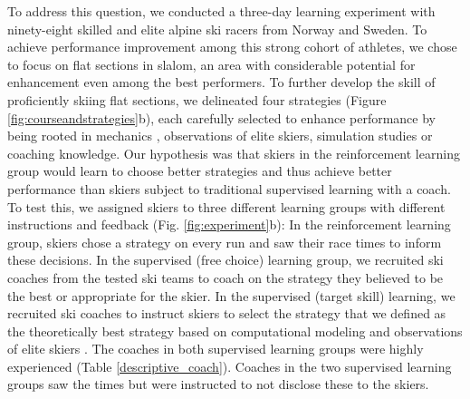 \documentclass[pdflatex,sn-mathphys-num]{sn-jnl}%
\theoremstyle{thmstyleone}%
\theoremstyle{thmstyletwo}%
\theoremstyle{thmstylethree}%
\begin{document}
To address this question, we conducted a three-day learning experiment with ninety-eight skilled and elite alpine ski racers from Norway and Sweden. To achieve performance improvement among this strong cohort of athletes, we chose to focus on flat sections in slalom, an area with considerable potential for enhancement even among the best performers. To further develop the skill of proficiently skiing flat sections, we delineated four strategies (Figure \ref{fig:courseandstrategies}b), each carefully selected to enhance performance by being rooted in mechanics \cite{lind_physics_2013}, observations of elite skiers\cite{magelssen_is_2022, reid_kinematic_2010}, simulation studies \cite{mote_accelerations_1983, luginbuhl_identification_2023} or coaching knowledge. Our hypothesis was that skiers in the reinforcement learning group would learn to choose better strategies and thus achieve better performance than skiers subject to traditional supervised learning with a coach. To test this, we assigned skiers to three different learning groups with different instructions and feedback (Fig. \ref{fig:experiment}b): In the reinforcement learning group, skiers chose a strategy on every run and saw their race times to inform these decisions. In the supervised (free choice) learning group, we recruited ski coaches from the tested ski teams to coach on the strategy they believed to be the best or appropriate for the skier. In the supervised (target skill) learning, we recruited ski coaches to instruct skiers to select the strategy that we defined as the theoretically best strategy based on computational modeling \cite{lind_physics_2013, mote_accelerations_1983} and observations of elite skiers \cite{reid_alpine_2020, magelssen_is_2022}. The coaches in both supervised learning groups were highly experienced (Table \ref{descriptive_coach}). Coaches in the two supervised learning groups saw the times but were instructed to not disclose these to the skiers. 
\end{document}
